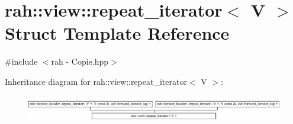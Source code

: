 \hypertarget{structrah_1_1view_1_1repeat__iterator}{}\section{rah\+::view\+::repeat\+\_\+iterator$<$ V $>$ Struct Template Reference}
\label{structrah_1_1view_1_1repeat__iterator}


{\ttfamily \#include $<$rah -\/ Copie.\+hpp$>$}

Inheritance diagram for rah\+::view\+::repeat\+\_\+iterator$<$ V $>$\+:\begin{figure}[H]
\begin{center}
\leavevmode
\includegraphics[height=1.157025cm]{structrah_1_1view_1_1repeat__iterator}
\end{center}
\end{figure}
